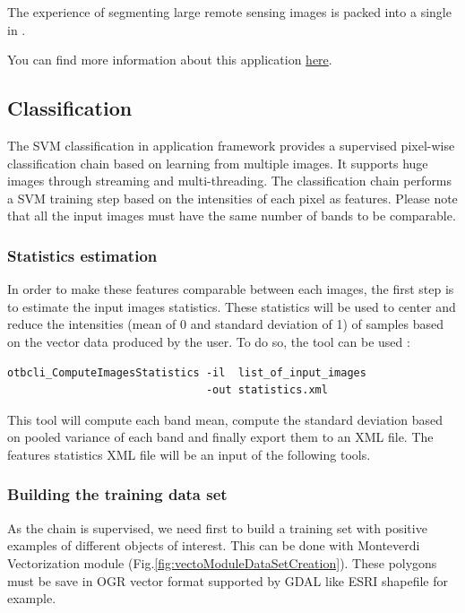 The experience of segmenting large remote sensing images is packed into a single
 in \app.

You can find more information about this application
\href{http://blog.orfeo-toolbox.org/preview/coming-next-large-scale-segmentation}{here}.

\subsection{Classification}\label{ssec:classification}

The SVM classification in application framework provides a supervised pixel-wise
classification chain based on learning from multiple images. It supports huge
images through streaming and multi-threading.
The classification chain performs a SVM training step based on the intensities
of each pixel as features. Please note that all the input images must have the
same number of bands to be comparable.

\subsubsection{Statistics estimation}
In order to make these features comparable between each images, the first step
is to estimate the input images statistics. These statistics will be used to
center and reduce the intensities (mean of 0 and standard deviation of 1) of
samples based on the vector data produced by the user. To do so, the
 tool can be used :

\begin{verbatim}
otbcli_ComputeImagesStatistics -il  list_of_input_images
                               -out statistics.xml
\end{verbatim}

This tool will compute each band mean, compute the standard deviation based on
pooled variance of each band and finally export them to an XML file.
The features statistics XML file will be an input of the following tools.

\subsubsection{Building the training data set}

As the chain is supervised, we need first to build a training set with
positive examples of different objects of interest. This can be done
with Monteverdi Vectorization module
(Fig.\ref{fig:vectoModuleDataSetCreation}).
These polygons must be save in OGR vector format supported
by GDAL like ESRI shapefile for example.

